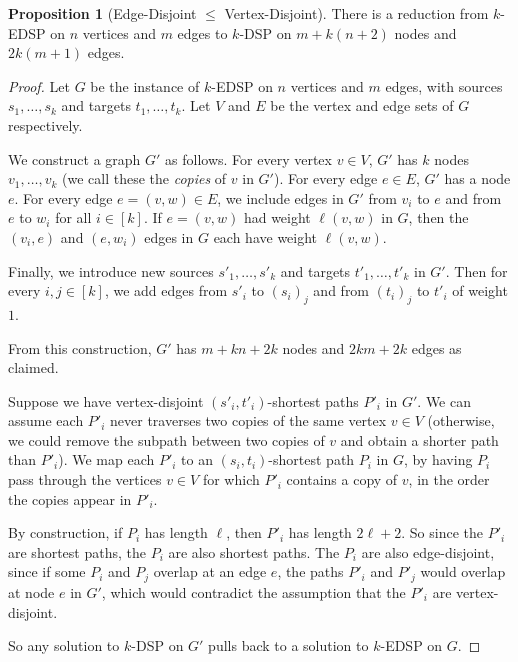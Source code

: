 \documentclass[11pt]{article}
\theoremstyle{definition}
\newtheorem{proposition}[theorem]{Proposition}
\begin{document}
\begin{proposition}[Edge-Disjoint $\le$ Vertex-Disjoint]
    \label{app-prop:edge-to-vertex}
    There is a reduction from \textsf{$k$-EDSP} on $n$ vertices and $m$ edges to \textsf{$k$-DSP} on $m+k(n+2)$ nodes and $2k(m+1)$ edges.
\end{proposition}
\begin{proof}
    Let $G$ be the instance of \textsf{$k$-EDSP} on $n$ vertices and $m$ edges, with sources $s_1, \dots, s_k$ and targets $t_1, \dots, t_k$.
    Let $V$ and $E$ be the vertex and edge sets of $G$ respectively.
    
    We construct a graph $G'$ as follows.
    For every vertex $v\in V$, $G'$ has $k$ nodes $v_1, \dots, v_k$ (we call these the \emph{copies} of $v$ in $G'$).
    For every edge $e\in E$, $G'$ has a node $e$.
    For every edge $e = (v,w)\in E$, we include edges in $G'$ from $v_i$ to $e$ and from $e$ to $w_i$ for all $i\in [k]$.
    If $e = (v,w)$ had weight $\ell(v,w)$ in $G$, then the $(v_i,e)$ and $(e,w_i)$ edges in $G$ each have weight $\ell(v,w)$.

    Finally, we introduce new sources $s'_1, \dots, s'_k$ and targets $t'_1, \dots, t'_k$ in $G'$.
    Then for every $i,j\in [k]$, we add edges from $s'_i$ to $(s_i)_j$ and from $(t_i)_j$ to $t'_i$ of weight $1$.

    From this construction, $G'$ has $m+kn + 2k$ nodes and $2km + 2k$ edges as claimed.


    Suppose we have vertex-disjoint $(s'_i,t'_i)$-shortest paths $P'_i$ in $G'$.
    We can assume each $P'_i$ never traverses two copies of the same vertex $v\in V$ (otherwise, we could remove the subpath between two copies of $v$ and obtain a shorter path than $P'_i$).
    We map each $P'_i$ to an $(s_i,t_i)$-shortest path $P_i$ in $G$, by having $P_i$ pass through the vertices $v\in V$ for which $P'_i$ contains a copy of $v$, in the order the copies appear in $P'_i$.

    By construction, if $P_i$ has length $\ell$, then $P'_i$ has length $2\ell + 2$.
    So since the $P'_i$ are shortest paths, the $P_i$ are also shortest paths.
    The $P_i$ are also edge-disjoint, since if some $P_i$ and $P_j$ overlap at an edge $e$, the paths $P'_i$ and $P'_j$ would overlap at node $e$ in $G'$, which would contradict the assumption that the $P'_i$ are vertex-disjoint.

    So any solution to \textsf{$k$-DSP} on $G'$ pulls back to a solution to \textsf{$k$-EDSP} on $G$.


\end{proof}
\end{document}
